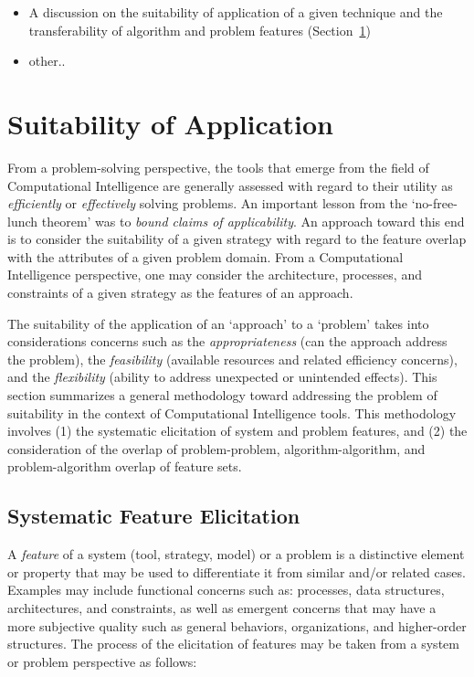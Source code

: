 \documentclass[a4paper, 11pt]{article}
\begin{document}
\begin{itemize} 
  \item A discussion on the suitability of application of a given technique and the transferability of algorithm and problem features (Section~\ref{sec:suitability})
  \item other..
\end{itemize}

%
%
\section{Suitability of Application}
\label{sec:suitability}
From a problem-solving perspective, the tools that emerge from the field of Computational Intelligence are generally assessed with regard to their utility as \emph{efficiently} or \emph{effectively} solving problems.
An important lesson from the `no-free-lunch theorem' was to \emph{bound claims of applicability}. An approach toward this end is to consider the suitability of a given strategy with regard to the feature overlap with the attributes of a given problem domain. From a Computational Intelligence perspective, one may consider the architecture, processes, and constraints of a given strategy as the features of an approach. 

The suitability of the application of an `approach' to a `problem' takes into considerations concerns such as the \emph{appropriateness} (can the approach address the problem), the \emph{feasibility} (available resources and related efficiency concerns), and the \emph{flexibility} (ability to address unexpected or unintended effects).
This section summarizes a general methodology toward addressing the problem of suitability in the context of Computational Intelligence tools. This methodology involves (1) the systematic elicitation of system and problem features, and (2) the consideration of the overlap of problem-problem, algorithm-algorithm, and problem-algorithm overlap of feature sets. 

\subsection{Systematic Feature Elicitation}
A \emph{feature} of a system (tool, strategy, model) or a problem is a distinctive element or property that may be used to differentiate it from similar and/or related cases. Examples may include functional concerns such as: processes, data structures, architectures, and constraints, as well as emergent concerns that may have a more subjective quality such as general behaviors, organizations, and higher-order structures. The process of the elicitation of features may be taken from a system or problem perspective as follows:
\end{document}
